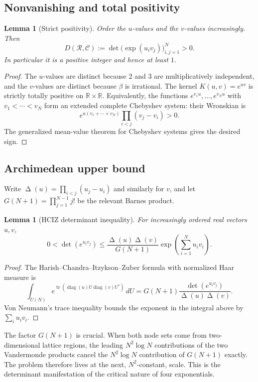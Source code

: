 \documentclass[11pt]{article}
\newtheorem{lemma}[theorem]{Lemma}
\theoremstyle{definition}
\newcommand{\R}{\mathbb R}
\newcommand{\DeltaV}{\mathop{\Delta}\nolimits}
\begin{document}
\subsection{Nonvanishing and total positivity}

\begin{lemma}[Strict positivity]\label{lem:tp}
Order the $u$-values and the $v$-values increasingly.  Then
\[
 D(\mathcal R,\mathcal C):=\det\bigl(\exp(u_i v_j)\bigr)_{i,j=1}^N>0.
\]
In particular it is a positive integer and hence at least $1$.
\end{lemma}
\begin{proof}
The $u$-values are distinct because $2$ and $3$ are multiplicatively
independent, and the $v$-values are distinct because $\beta$ is irrational.
The kernel $K(u,v)=e^{uv}$ is strictly totally positive on $\R\times\R$.
Equivalently, the functions $e^{v_1u},\ldots,e^{v_Nu}$ with
$v_1<\cdots<v_N$ form an extended complete Chebyshev system: their Wronskian is
\[
 e^{u(v_1+\cdots+v_N)}\prod_{i<j}(v_j-v_i)>0.
\]
The generalized mean-value theorem for Chebyshev systems gives the desired
sign.
\end{proof}

\subsection{Archimedean upper bound}

Write $\DeltaV(u)=\prod_{i<j}(u_j-u_i)$ and similarly for $v$, and let
$G(N+1)=\prod_{j=1}^{N-1}j!$ be the relevant Barnes product.

\begin{lemma}[HCIZ determinant inequality]\label{lem:HCIZ}
For increasingly ordered real vectors $u,v$,
\begin{equation}\label{eq:HCIZ-bound}
 0<\det(e^{u_i v_j})
 \le
 \frac{\DeltaV(u)\DeltaV(v)}{G(N+1)}
 \exp\!\left(\sum_{i=1}^N u_i v_i\right).
\end{equation}
\end{lemma}
\begin{proof}
The Harish--Chandra--Itzykson--Zuber formula with normalized Haar measure is
\[
 \int_{U(N)}e^{\operatorname{tr}(\operatorname{diag}(u)
 U\operatorname{diag}(v)U^*)}\,dU
 =G(N+1)\frac{\det(e^{u_i v_j})}{\DeltaV(u)\DeltaV(v)}.
\]
Von Neumann's trace inequality bounds the exponent in the integral above by
$\sum_i u_i v_i$.
\end{proof}

The factor $G(N+1)$ is crucial.  When both node sets come from two-dimensional
lattice regions, the leading $N^2\log N$ contributions of the two Vandermonde
products cancel the $N^2\log N$ contribution of $G(N+1)$ exactly.  The problem
therefore lives at the next, $N^2$-constant, scale.  This is the determinant
manifestation of the critical nature of four exponentials.
\end{document}
